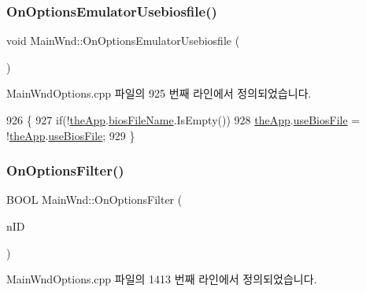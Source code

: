 \subsubsection{\texorpdfstring{On\+Options\+Emulator\+Usebiosfile()}{OnOptionsEmulatorUsebiosfile()}}
{\footnotesize\ttfamily void Main\+Wnd\+::\+On\+Options\+Emulator\+Usebiosfile (\begin{DoxyParamCaption}{ }\end{DoxyParamCaption})\hspace{0.3cm}{\ttfamily [protected]}}



Main\+Wnd\+Options.\+cpp 파일의 925 번째 라인에서 정의되었습니다.


\begin{DoxyCode}
926 \{
927   \textcolor{keywordflow}{if}(!\mbox{\hyperlink{_v_b_a_8cpp_a8095a9d06b37a7efe3723f3218ad8fb3}{theApp}}.\mbox{\hyperlink{class_v_b_a_a7bc70f5f75c0e2e3e2b1b63411af4559}{biosFileName}}.IsEmpty())
928     \mbox{\hyperlink{_v_b_a_8cpp_a8095a9d06b37a7efe3723f3218ad8fb3}{theApp}}.\mbox{\hyperlink{class_v_b_a_a0ad579388cd52cc4df5fadc560f27a37}{useBiosFile}} = !\mbox{\hyperlink{_v_b_a_8cpp_a8095a9d06b37a7efe3723f3218ad8fb3}{theApp}}.\mbox{\hyperlink{class_v_b_a_a0ad579388cd52cc4df5fadc560f27a37}{useBiosFile}};
929 \}
\end{DoxyCode}
\mbox{\label{class_main_wnd_adfab8994e984c069ace4f06dafcbfbd1}} 
\subsubsection{\texorpdfstring{On\+Options\+Filter()}{OnOptionsFilter()}}
{\footnotesize\ttfamily B\+O\+OL Main\+Wnd\+::\+On\+Options\+Filter (\begin{DoxyParamCaption}\item[{U\+I\+NT}]{n\+ID }\end{DoxyParamCaption})}



Main\+Wnd\+Options.\+cpp 파일의 1413 번째 라인에서 정의되었습니다.


